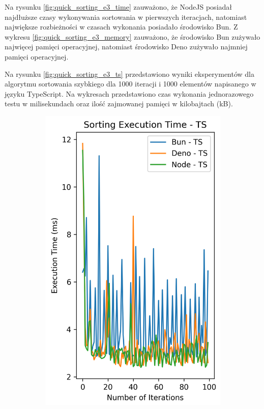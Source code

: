 Na rysunku \ref{fig:quick_sorting_e3_time} zauważono, że NodeJS posiadał najdłuższe czasy wykonywania sortowania w pierwszych iteracjach, natomiast największe rozbieżności w czasach wykonania posiadało środowisko Bun. Z wykresu \ref{fig:quick_sorting_e3_memory} zauważono, że środowisko Bun zużywało najwięcej pamięci operacyjnej, natomiast środowisko Deno zużywało najmniej pamięci operacyjnej.

Na rysunku \ref{fig:quick_sorting_e3_ts} przedstawiono wyniki eksperymentów dla algorytmu sortowania szybkiego dla 1000 iteracji i 1000 elementów napisanego w języku TypeScript. Na wykresach przedstawiono czas wykonania jednorazowego testu w milisekundach oraz ilość zajmowanej pamięci w kilobajtach (kB).

\begin{figure}[H]
  \centering
  \begin{subfigure}[b]{0.42\textwidth}
    \centering
    \includegraphics[width=\textwidth]{Figures/sorting/sorting_quick_100_10000_ts_time.png}

\end{subfigure}
\end{figure}
